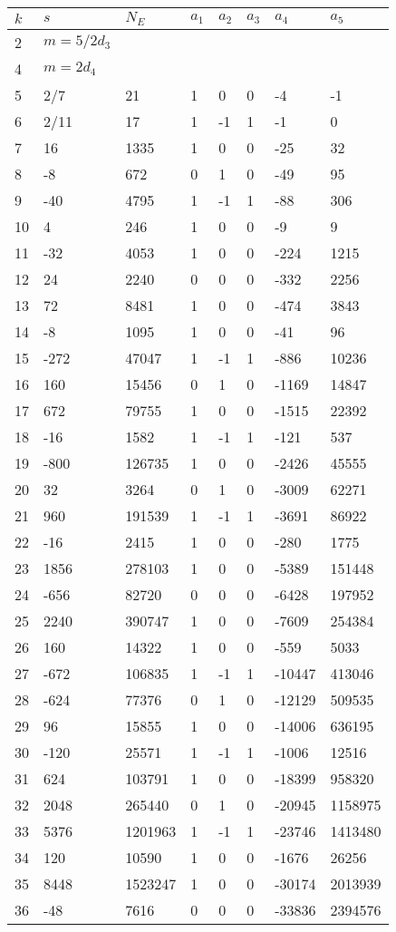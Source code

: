 \documentclass{amsart}
\begin{document}
\begin{longtable}{|l|l|l|lllll|}
\hline
$k$ & $s$ & $N_E$ & $a_1$ & $a_2$ & $a_3$ & $a_4$ & $a_5$\\
\hline
2&$m=5/2d_{3}$&&\multicolumn{5}{c|}{}\\
4&$m=2d_{4}$&&\multicolumn{5}{c|}{}\\
5&2/7&21&1&0&0&-4&-1\\
6&2/11&17&1&-1&1&-1&0\\
7&16&1335&1&0&0&-25&32\\
8&-8&672&0&1&0&-49&95\\
9&-40&4795&1&-1&1&-88&306\\
10&4&246&1&0&0&-9&9\\
11&-32&4053&1&0&0&-224&1215\\
12&24&2240&0&0&0&-332&2256\\
13&72&8481&1&0&0&-474&3843\\
14&-8&1095&1&0&0&-41&96\\
15&-272&47047&1&-1&1&-886&10236\\
16&160&15456&0&1&0&-1169&14847\\
17&672&79755&1&0&0&-1515&22392\\
18&-16&1582&1&-1&1&-121&537\\
19&-800&126735&1&0&0&-2426&45555\\
20&32&3264&0&1&0&-3009&62271\\
21&960&191539&1&-1&1&-3691&86922\\
22&-16&2415&1&0&0&-280&1775\\
23&1856&278103&1&0&0&-5389&151448\\
24&-656&82720&0&0&0&-6428&197952\\
25&2240&390747&1&0&0&-7609&254384\\
26&160&14322&1&0&0&-559&5033\\
27&-672&106835&1&-1&1&-10447&413046\\
28&-624&77376&0&1&0&-12129&509535\\
29&96&15855&1&0&0&-14006&636195\\
30&-120&25571&1&-1&1&-1006&12516\\
31&624&103791&1&0&0&-18399&958320\\
32&2048&265440&0&1&0&-20945&1158975\\
33&5376&1201963&1&-1&1&-23746&1413480\\
34&120&10590&1&0&0&-1676&26256\\
35&8448&1523247&1&0&0&-30174&2013939\\
36&-48&7616&0&0&0&-33836&2394576\\

\end{longtable}
\end{document}
